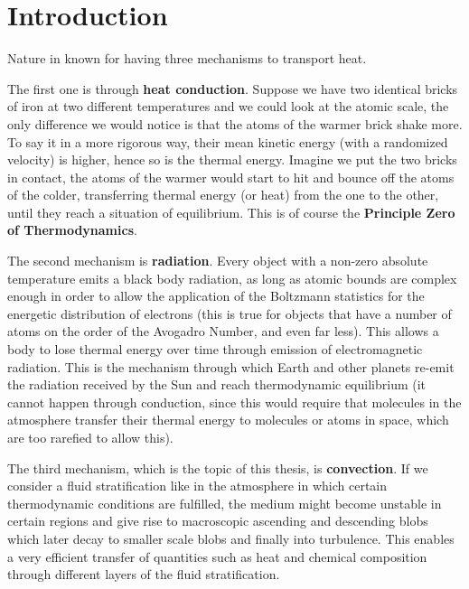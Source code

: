 

\chapter{Introduction}
Nature in known for having three mechanisms to transport heat.  

The first one is through \textbf{heat conduction}. Suppose we have two identical bricks of iron at two different temperatures and we could look at the atomic scale, the only difference we would notice is that the atoms of the warmer brick shake more. To say it in a more rigorous way, their mean kinetic energy (with a randomized velocity) is higher, hence so is the thermal energy. Imagine we put the two bricks in contact, the atoms of the warmer would start to hit and bounce off the atoms of the colder, transferring thermal energy (or heat) from the one to the other, until they reach a situation of equilibrium. This is of course the \textbf{Principle Zero of Thermodynamics}. 

The second mechanism is \textbf{radiation}. Every object with a non-zero absolute temperature emits a black body radiation, as long as atomic bounds are complex enough in order to allow the application of the Boltzmann statistics for the energetic distribution of electrons (this is true for objects that have a number of atoms on the order of the Avogadro Number, and even far less). This allows a body to lose thermal energy over time through emission of electromagnetic radiation. This is the mechanism through which Earth and other planets re-emit the radiation received by the Sun and reach thermodynamic equilibrium (it cannot happen through conduction, since this would require that molecules in the atmosphere transfer their thermal energy to molecules or atoms in space, which are too rarefied to allow this). 

The third mechanism, which is the topic of this thesis, is \textbf{convection}. If we consider a fluid stratification like in the atmosphere in which certain thermodynamic conditions are fulfilled, the medium might become unstable in certain regions and give rise to macroscopic ascending and descending blobs which later decay to smaller scale blobs and finally into turbulence. This enables a very efficient transfer of quantities such as heat and chemical composition through different layers of the fluid stratification. 

